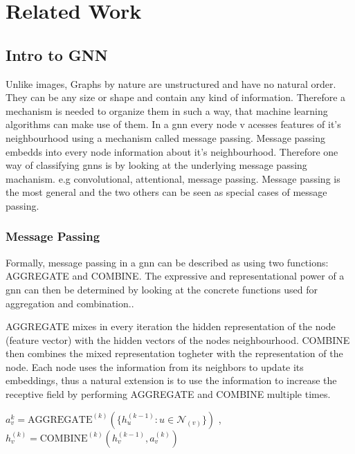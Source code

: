 %
\chapter{Related Work}
\label{sec:related}


\section{Intro to GNN}
\label{sec:related:intro}
Unlike images, Graphs by nature are unstructured and have no natural order.
They can be any size or shape and contain any kind of information.
Therefore a mechanism is needed to organize them in such a way, that machine learning algorithms
can make use of them.
In a \ac{gnn} every node v acesses features of it's neighbourhood using a mechanism called message passing.
Message passing embedds into every node information about it's neighbourhood.
Therefore one way of classifying \acp{gnn} is by looking at the underlying message passing
machanism. e.g convolutional, attentional, message passing.
Message passing is the most general and the two others can be seen as special cases of message passing.


\subsection{Message Passing}
\label{sec:related:message}
Formally, message passing in a \ac{gnn} can be described as using two functions:
AGGREGATE and COMBINE. The expressive and representational power of a \ac{gnn} can
then be determined by looking at the concrete functions used for aggregation and combination.\cite{Xu2019}.

AGGREGATE mixes in every iteration the hidden representation of the node (feature vector)
with the hidden vectors of the nodes neighbourhood. COMBINE then combines the mixed representation togheter with the representation of the node.
Each node uses the information from its neighbors to update its embeddings, thus a natural extension is to use the
information to increase the receptive field by performing AGGREGATE and COMBINE multiple times.

$a_{v}^{k} = \mathrm{AGGREGATE}^{(k)}(\{h_{u}^{(k-1)}: u \in \mathcal{N}_{(v)}\})$ , $h_{v}^{(k)} = \mathrm{COMBINE}^{(k)}(h_{v}^{(k-1)}, a_{v}^{(k)})$

